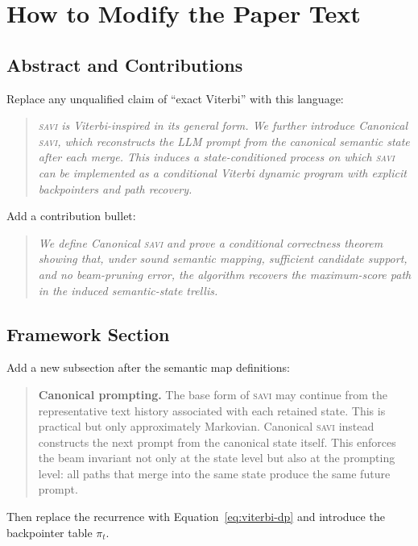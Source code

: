 \documentclass[11pt,letterpaper]{article}
\newcommand{\SAVI}{\textsc{savi}\xspace}
\begin{document}
\section{How to Modify the Paper Text}

\subsection{Abstract and Contributions}

Replace any unqualified claim of ``exact Viterbi'' with this language:

\begin{quote}
\itshape
\SAVI is Viterbi-inspired in its general form.
We further introduce Canonical \SAVI, which reconstructs the LLM prompt from the canonical
semantic state after each merge.
This induces a state-conditioned process on which \SAVI can be implemented as a conditional Viterbi
dynamic program with explicit backpointers and path recovery.
\end{quote}

Add a contribution bullet:

\begin{quote}
\itshape
We define Canonical \SAVI and prove a conditional correctness theorem showing that, under sound
semantic mapping, sufficient candidate support, and no beam-pruning error, the algorithm recovers the
maximum-score path in the induced semantic-state trellis.
\end{quote}

\subsection{Framework Section}

Add a new subsection after the semantic map definitions:

\begin{quote}
\textbf{Canonical prompting.}
The base form of \SAVI may continue from the representative text history associated with each retained
state.
This is practical but only approximately Markovian.
Canonical \SAVI instead constructs the next prompt from the canonical state itself.
This enforces the beam invariant not only at the state level but also at the prompting level:
all paths that merge into the same state produce the same future prompt.
\end{quote}

Then replace the recurrence with Equation~\eqref{eq:viterbi-dp} and introduce the backpointer
table $\pi_t$.
\end{document}

